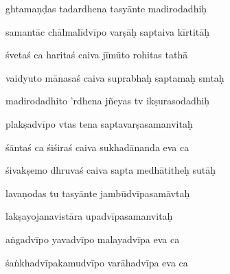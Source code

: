 ghtamaṇḍas tadardhena tasyānte madirodadhiḥ\thinspace{\dandab} \dontdisplaylinenum

samantāc chālmalīdvīpo varṣāḥ saptaiva kīrtitāḥ \veg\dontdisplaylinenum

śvetaś ca haritaś caiva jīmūto rohitas tathā\thinspace{\dandab} \dontdisplaylinenum

vaidyuto mānasaś caiva suprabhaḥ saptamaḥ smtaḥ \veg\dontdisplaylinenum

madirodadhito 'rdhena jñeyas tv ikṣurasodadhiḥ\thinspace{\dandab} \dontdisplaylinenum

plakṣadvīpo vtas tena saptavarṣasamanvitaḥ \veg\dontdisplaylinenum

śāntaś ca śiśiraś caiva sukhadānanda eva ca\thinspace{\dandab} \dontdisplaylinenum

śivakṣemo dhruvaś caiva sapta medhātitheḥ sutāḥ \veg\dontdisplaylinenum

lavaṇodas tu tasyānte jambūdvīpasamāvtaḥ\thinspace{\dandab} \dontdisplaylinenum

lakṣayojanavistāra upadvīpasamanvitaḥ \veg\dontdisplaylinenum

aṅgadvīpo yavadvīpo malayadvīpa eva ca\thinspace{\dandab} \dontdisplaylinenum

śaṅkhadvīpakamudvīpo varāhadvīpa eva ca \veg\dontdisplaylinenum

